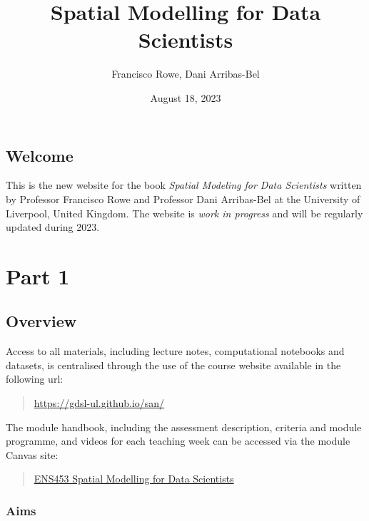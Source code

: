 \documentclass[
  letterpaper,
  krantz2]{style/krantz}
\title{Spatial Modelling for Data Scientists}
\author{Francisco Rowe, Dani Arribas-Bel}
\date{August 18, 2023}
\begin{document}
\maketitle
\ifdefined\Shaded\renewenvironment{Shaded}{\begin{tcolorbox}[frame hidden, colback={shadecolor}, boxrule=0pt, enhanced, breakable]}{\end{tcolorbox}}\fi


\hypertarget{welcome}{%
\chapter*{Welcome}\label{welcome}}


This is the new website for the book \emph{Spatial Modeling for Data
Scientists} written by Professor Francisco Rowe and Professor Dani
Arribas-Bel at the University of Liverpool, United Kingdom. The website
is \emph{work in progress} and will be regularly updated during 2023.

\part{Part 1}

\hypertarget{overview}{%
\chapter{Overview}\label{overview}}

Access to all materials, including lecture notes, computational
notebooks and datasets, is centralised through the use of the course
website available in the following url:

\begin{quote}
\url{https://gdsl-ul.github.io/san/}
\end{quote}

The module handbook, including the assessment description, criteria and
module programme, and videos for each teaching week can be accessed via
the module Canvas site:

\begin{quote}
\href{https://liverpool.instructure.com}{ENS453 Spatial Modelling for
Data Scientists}
\end{quote}

\hypertarget{aims}{%
\section{Aims}\label{aims}}
\end{document}
